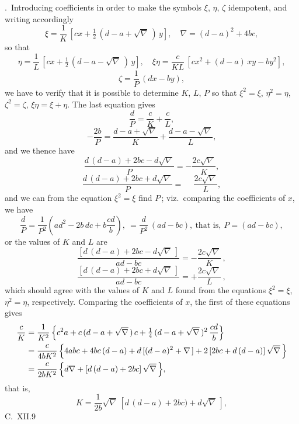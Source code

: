 \documentclass[11pt,a4paper]{article}
\providecommand{\textsc}[1]{{\scshape #1}}
\begin{document}
\thispagestyle{plain}
.\ Introducing coefficients in order to make the symbols $\xi$, $\eta$, $\zeta$ idempotent, and writing accordingly
\[
\xi = \frac{1}{K}\,[cx + \tfrac{1}{2}\,(d - a + \sqrt{\nabla}\,)\,y],\quad \nabla = (d - a)^{2} + 4bc,
\]
so that
\[
\eta = \frac{1}{L}\,[cx + \tfrac{1}{2}\,(d - a - \sqrt{\nabla}\,)\,y],\quad \xi\eta = \frac{c}{KL}\,[cx^{2} + (d - a)\,xy - by^{2}],
\]
\[
\zeta = \frac{1}{P}\,(dx - by),
\]
we have to verify that it is possible to determine $K$, $L$, $P$ so that $\xi^{2} = \xi$, $\eta^{2} = \eta$, $\zeta^{2} = \zeta$, $\xi\eta = \xi + \eta$.  The last equation gives
\[
\frac{d}{P} = \frac{c}{K} + \frac{c}{L},
\]
\[
-\frac{2b}{P} = \frac{d - a + \sqrt{\nabla}}{K} + \frac{d - a - \sqrt{\nabla}}{L},
\]
and we thence have
\[
\frac{d\,(d - a) + 2bc - d\sqrt{\nabla}}{P} = -\frac{2c\sqrt{\nabla}}{K},
\]
\[
\frac{d\,(d - a) + 2bc + d\sqrt{\nabla}}{P} = \phantom{-}\frac{2c\sqrt{\nabla}}{L},
\]
and we can from the equation $\xi^{2} = \xi$ find $P$\,; viz.\ comparing the coefficients of $x$, we have
\[
\frac{d}{P} = \frac{1}{P^{2}}\!\left(ad^{2} - 2b\,dc + b\frac{cd}{b}\right),\ = \frac{d}{P^{2}}\,(ad - bc),\ \text{that is},\ P = (ad - bc),
\]
or the values of $K$ and $L$ are
\[
\frac{[d\,(d - a) + 2bc - d\sqrt{\nabla}\,]}{ad - bc} = -\frac{2c\sqrt{\nabla}}{K}\,,
\]
\[
\frac{[d\,(d - a) + 2bc + d\sqrt{\nabla}\,]}{ad - bc} = +\frac{2c\sqrt{\nabla}}{L}\,,
\]
which should agree with the values of $K$ and $L$ found from the equations $\xi^{2} = \xi$, $\eta^{2} = \eta$, respectively.  Comparing the coefficients of $x$, the first of these equations gives
\[
\begin{aligned}
\frac{c}{K} &= \frac{1}{K^{2}}\,\Bigl\{c^{2}a + c\,(d - a + \sqrt{\nabla}\,)\,c + \tfrac{1}{4}\,(d - a + \sqrt{\nabla}\,)^{2}\,\frac{cd}{b}\Bigr\}\\
            &= \frac{c}{4bK^{2}}\,\Bigl\{4abc + 4bc\,(d - a) + d\,[(d - a)^{2} + \nabla\,] + 2\,[2bc + d\,(d - a)]\,\sqrt{\nabla}\,\Bigr\}\\
            &= \frac{c}{2bK^{2}}\,\Bigl\{d\nabla + [d\,(d - a) + 2bc]\,\sqrt{\nabla}\,\Bigr\},
\end{aligned}
\]
that is,
\[
K = \frac{1}{2b}\sqrt{\nabla}\,[d\,(d - a) + 2bc) + d\sqrt{\nabla}\,],
\]
\vfill
\noindent C.\ XII.\hfill 9
\clearpage

\fancyhead[C]{\small\textsc{on double algebra.}}
\fancyhead[R]{\small [814}
\end{document}
